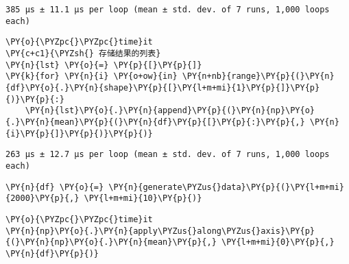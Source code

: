     \begin{Verbatim}[commandchars=\\\{\}]
385 µs ± 11.1 µs per loop (mean ± std. dev. of 7 runs, 1,000 loops each)
    \end{Verbatim}

    \begin{tcolorbox}[breakable, size=fbox, boxrule=1pt, pad at break*=1mm,colback=cellbackground, colframe=cellborder]
\begin{Verbatim}[commandchars=\\\{\}]
\PY{o}{\PYZpc{}\PYZpc{}time}it
\PY{c+c1}{\PYZsh{} 存储结果的列表}
\PY{n}{lst} \PY{o}{=} \PY{p}{[}\PY{p}{]}
\PY{k}{for} \PY{n}{i} \PY{o+ow}{in} \PY{n+nb}{range}\PY{p}{(}\PY{n}{df}\PY{o}{.}\PY{n}{shape}\PY{p}{[}\PY{l+m+mi}{1}\PY{p}{]}\PY{p}{)}\PY{p}{:}
    \PY{n}{lst}\PY{o}{.}\PY{n}{append}\PY{p}{(}\PY{n}{np}\PY{o}{.}\PY{n}{mean}\PY{p}{(}\PY{n}{df}\PY{p}{[}\PY{p}{:}\PY{p}{,} \PY{n}{i}\PY{p}{]}\PY{p}{)}\PY{p}{)}
\end{Verbatim}
\end{tcolorbox}

    \begin{Verbatim}[commandchars=\\\{\}]
263 µs ± 12.7 µs per loop (mean ± std. dev. of 7 runs, 1,000 loops each)
    \end{Verbatim}

    \begin{tcolorbox}[breakable, size=fbox, boxrule=1pt, pad at break*=1mm,colback=cellbackground, colframe=cellborder]
\begin{Verbatim}[commandchars=\\\{\}]
\PY{n}{df} \PY{o}{=} \PY{n}{generate\PYZus{}data}\PY{p}{(}\PY{l+m+mi}{2000}\PY{p}{,} \PY{l+m+mi}{10}\PY{p}{)}
\end{Verbatim}
\end{tcolorbox}

    \begin{tcolorbox}[breakable, size=fbox, boxrule=1pt, pad at break*=1mm,colback=cellbackground, colframe=cellborder]
\begin{Verbatim}[commandchars=\\\{\}]
\PY{o}{\PYZpc{}\PYZpc{}time}it
\PY{n}{np}\PY{o}{.}\PY{n}{apply\PYZus{}along\PYZus{}axis}\PY{p}{(}\PY{n}{np}\PY{o}{.}\PY{n}{mean}\PY{p}{,} \PY{l+m+mi}{0}\PY{p}{,} \PY{n}{df}\PY{p}{)}
\end{Verbatim}
\end{tcolorbox}

